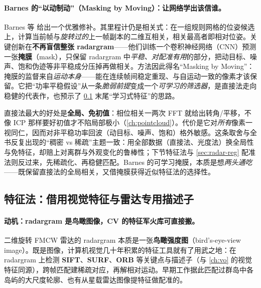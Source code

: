 \paragraph{Barnes 的“以动制动”（Masking by Moving）：让网络学出该信谁。}
Barnes 等\cite{barnes2020masking} 给出一个优雅修补。其里程计仍是相关式：在一组规则网格的位姿候选上，计算当前帧与\emph{旋转过的}上一帧副本的二维互相关，相关最高者即相对位姿。关键创新在\textbf{不再盲信整张 radargram}——他们训练一个卷积神经网络（CNN）预测一张\textbf{掩膜}（mask），只保留 radargram 中\emph{平稳、对配准有用}的部分，把动目标、噪声、饱和伪迹等非平稳成分压掉再做相关。方法因此得名“Masking by Moving”：掩膜的监督来自\emph{运动本身}——能在连续帧间稳定重现、与自运动一致的像素才该保留。它把“功率平稳假设”从一条\emph{脆弱前提}变成一个\emph{可学习的筛选器}，是直接法走向稳健的代表作，也预示了 \cref{subsec:radar-feature} 末尾“学习式特征”的思路。

\begin{insight}\label{ins:radar-direct-tradeoff}
直接法最大的好处是\textbf{全局、免初值}：相位相关一两次 FFT 就给出转角/平移，不像 ICP 那样要好初值才不陷局部极小（\cref{ch:pointcloud}）。代价是它对\emph{所有}像素一视同仁，因而对非平稳功率回波（动目标、噪声、饱和）格外敏感。这条取舍与全书反复出现的“稠密 vs 稀疏”主题一致：用全部数据（直接法、光度法）换全局性与免特征，却赔上对离群与外观变化的鲁棒性；下节特征法与 \cref{sec:radar-reg} 配准法则反过来，先稀疏化、再稳健匹配。Barnes 的可学习掩膜，本质是想\emph{两头通吃}——既保留直接法的全局相关，又借掩膜获得近似特征法的选择性。
\end{insight}

\subsection{特征法：借用视觉特征与雷达专用描述子}
\label{subsec:radar-feature}

\paragraph{动机：radargram 是鸟瞰图像，CV 的特征军火库可直接搬。}
二维旋转 FMCW 雷达的 radargram 本质是一张\textbf{鸟瞰强度图}（bird's-eye-view image）。既是图像，计算机视觉几十年积累的特征工具就有了用武之地\cite{carlone2026handbook}：在 radargram 上检测 \textbf{SIFT}、\textbf{SURF}、\textbf{ORB} 等关键点与描述子（与 \cref{ch:vo} 的视觉特征同源），跨帧匹配建稀疏对应，再解相对运动。早期工作据此匹配过群岛中各岛屿的大尺度轮廓、也有从星载雷达图像提特征做配准的。


